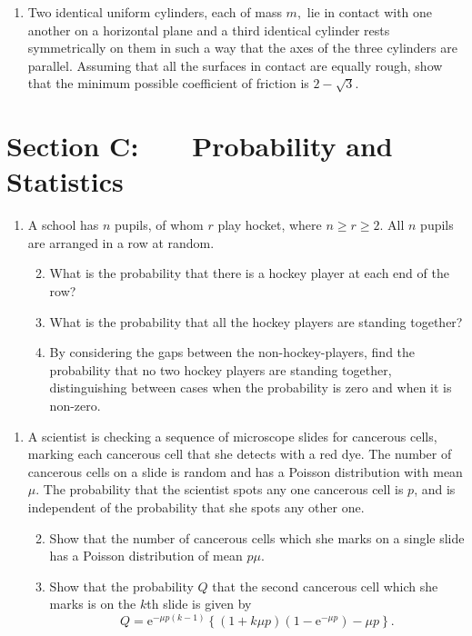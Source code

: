 \documentclass[a4, 11pt]{report}
\newlength{\qspace}
\newcounter{qnumber}
\newenvironment{question}%
 {\vspace{\qspace}
  \begin{enumerate}[\bfseries 1\quad][10]%
    \setcounter{enumi}{\value{qnumber}}%
    \item%
 }
{
  \end{enumerate}
  \filbreak
  \stepcounter{qnumber}
 }
\newenvironment{questionparts}[1][1]%
 {
  \begin{enumerate}[\bfseries (i)]%
    \setcounter{enumii}{#1}
    \addtocounter{enumii}{-1}
    \setlength{\itemsep}{5mm}
    \setlength{\parskip}{8pt}
 }
 {
  \end{enumerate}
 }
\begin{document}

\begin{question}
Two identical uniform cylinders, each of mass $m,$ lie in contact
with one another on a horizontal plane and a third identical cylinder
rests symmetrically on them in such a way that the axes of the three
cylinders are parallel. Assuming that all the surfaces in contact
are equally rough, show that the minimum possible coefficient of friction
is $2-\sqrt{3}.$ 
\end{question}
	

	
	\newpage
\section*{Section C: \ \ \ Probability and Statistics}


\begin{question}
A school has $n$ pupils, of whom $r$ play hocket, where $n\geqslant r\geqslant2.$
All $n$ pupils are arranged in a row at random. 

\begin{questionparts}
\item What is the probability that there is a hockey player at each end
of the row?
\item What is the probability that all the hockey players are standing together?
\item By considering the gaps between the non-hockey-players, find the probability
that no two hockey players are standing together, distinguishing between
cases when the probability is zero and when it is non-zero. 
\end{questionparts}
\end{question}

\begin{question}
A scientist is checking a sequence of microscope slides for cancerous
cells, marking each cancerous cell that she detects with a red dye.
The number of cancerous cells on a slide is random and has a Poisson
distribution with mean $\mu.$ The probability that the scientist
spots any one cancerous cell is $p$, and is independent of the probability
that she spots any other one. 
\begin{questionparts}
\item Show that the number of cancerous cells which she marks on a single
slide has a Poisson distribution of mean $p\mu.$ 
\item Show that the probability $Q$ that the second cancerous cell which
she marks is on the $k$th slide is given by 
\[
Q=\mathrm{e}^{-\mu p(k-1)}\left\{ (1+k\mu p)(1-\mathrm{e}^{-\mu p})-\mu p\right\} .
\]
\end{questionparts}
\end{question}
\end{document}
